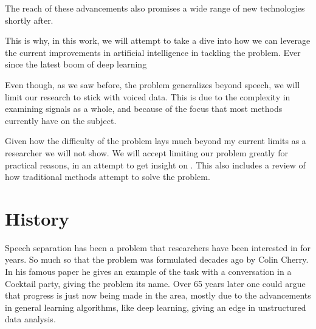 \documentclass{book}
\begin{document}
The reach of these advancements also promises a wide range of new technologies shortly after.
\par
This is why, in this work, we will attempt to take a dive into how we can leverage the current improvements in artificial intelligence in tackling the problem.
Ever since the latest boom of deep learning \cite{DeepLearning}
\par
Even though, as we saw before, the problem generalizes beyond speech, we will limit our research to stick with voiced data.
This is due to the complexity in examining signals as a whole, and because of the focus that most methods currently have on the subject.
\par
Given how the difficulty of the problem lays much beyond my current limits as a researcher we will not show.
We will accept limiting our problem greatly for practical reasons, in an attempt to get insight on .
This also includes a review of how traditional methods attempt to solve the problem.
\section{History}
\qquad Speech separation has been a problem that researchers have been interested in for years.
So much so that the problem was formulated decades ago by Colin Cherry\cite{Cherry}.
In his famous paper he gives an example of the task with a conversation in a Cocktail party, giving the problem its name.
Over 65 years later one could argue that progress is just now being made in the area, mostly due to the advancements in general learning algorithms, like deep learning, giving an edge in unstructured data analysis.
\end{document}

